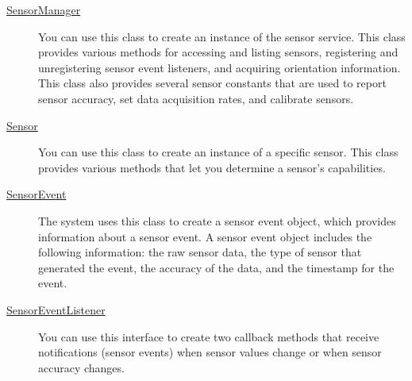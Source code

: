 \documentclass{article}
\begin{document}
\begin{description}
\item [  \href{https://developer.android.com/reference/android/hardware/SensorManager.html}{SensorManager}]

  You can use this class to create an instance of the sensor service. This class
  provides various methods for accessing and listing sensors, registering and
  unregistering sensor event listeners, and acquiring orientation information.
  This class also provides several sensor constants that are used to report sensor
  accuracy, set data acquisition rates, and calibrate sensors.

\item [
  \href{https://developer.android.com/reference/android/hardware/Sensor.html}{Sensor}]

  You can use this class to create an instance of a specific sensor. This class
  provides various methods that let you determine a sensor's capabilities.

\item[\href{https://developer.android.com/reference/android/hardware/SensorEvent.html}{SensorEvent}]

  The system uses this class to create a sensor event object, which provides
  information about a sensor event. A sensor event object includes the following
  information: the raw sensor data, the type of sensor that generated the event,
  the accuracy of the data, and the timestamp for the event.

\item[\href{https://developer.android.com/reference/android/hardware/SensorEventListener.html}{SensorEventListener}]

  You can use this interface to create two callback methods that receive
  notifications (sensor events) when sensor values change or when sensor accuracy
  changes.
\end{description}
\end{document}
